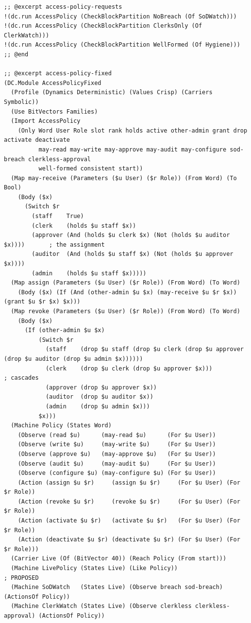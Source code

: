 \documentclass[11pt]{article}
\theoremstyle{definition}
\theoremstyle{plain}
\begin{document}
\begin{lstlisting}[style=mettafull]
;; @excerpt access-policy-requests
!(dc.run AccessPolicy (CheckBlockPartition NoBreach (Of SoDWatch)))
!(dc.run AccessPolicy (CheckBlockPartition ClerksOnly (Of ClerkWatch)))
!(dc.run AccessPolicy (CheckBlockPartition WellFormed (Of Hygiene)))
;; @end

;; @excerpt access-policy-fixed
(DC.Module AccessPolicyFixed
  (Profile (Dynamics Deterministic) (Values Crisp) (Carriers Symbolic))
  (Use BitVectors Families)
  (Import AccessPolicy
    (Only Word User Role slot rank holds active other-admin grant drop activate deactivate
          may-read may-write may-approve may-audit may-configure sod-breach clerkless-approval
          well-formed consistent start))
  (Map may-receive (Parameters ($u User) ($r Role)) (From Word) (To Bool)
    (Body ($x)
      (Switch $r
        (staff    True)
        (clerk    (holds $u staff $x))
        (approver (And (holds $u clerk $x) (Not (holds $u auditor $x))))       ; the assignment
        (auditor  (And (holds $u staff $x) (Not (holds $u approver $x))))
        (admin    (holds $u staff $x)))))
  (Map assign (Parameters ($u User) ($r Role)) (From Word) (To Word)
    (Body ($x) (If (And (other-admin $u $x) (may-receive $u $r $x)) (grant $u $r $x) $x)))
  (Map revoke (Parameters ($u User) ($r Role)) (From Word) (To Word)
    (Body ($x)
      (If (other-admin $u $x)
          (Switch $r
            (staff    (drop $u staff (drop $u clerk (drop $u approver (drop $u auditor (drop $u admin $x))))))
            (clerk    (drop $u clerk (drop $u approver $x)))                    ; cascades
            (approver (drop $u approver $x))
            (auditor  (drop $u auditor $x))
            (admin    (drop $u admin $x)))
          $x)))
  (Machine Policy (States Word)
    (Observe (read $u)      (may-read $u)      (For $u User))
    (Observe (write $u)     (may-write $u)     (For $u User))
    (Observe (approve $u)   (may-approve $u)   (For $u User))
    (Observe (audit $u)     (may-audit $u)     (For $u User))
    (Observe (configure $u) (may-configure $u) (For $u User))
    (Action (assign $u $r)     (assign $u $r)     (For $u User) (For $r Role))
    (Action (revoke $u $r)     (revoke $u $r)     (For $u User) (For $r Role))
    (Action (activate $u $r)   (activate $u $r)   (For $u User) (For $r Role))
    (Action (deactivate $u $r) (deactivate $u $r) (For $u User) (For $r Role)))
  (Carrier Live (Of (BitVector 40)) (Reach Policy (From start)))
  (Machine LivePolicy (States Live) (Like Policy))                                          ; PROPOSED
  (Machine SoDWatch   (States Live) (Observe breach sod-breach) (ActionsOf Policy))
  (Machine ClerkWatch (States Live) (Observe clerkless clerkless-approval) (ActionsOf Policy))


\end{lstlisting}
\end{document}
